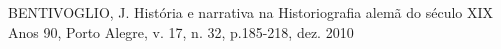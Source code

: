 \documentclass[
12pt,		%
openright,	%
twoside,  %
a4paper,			%
chapter=TITLE,		%
english,			%
french,				%
spanish,			%
brazil				%
]{USPSC-classe/USPSC_RedarTex}
\begin{document}
\begin{flushleft}
\begin{flushleft}
\begin{flushleft}
\begin{flushleft}
\begin{flushleft}
\begin{flushleft}
\begin{flushleft}
\begin{flushleft}
\begin{flushleft}
\begin{flushleft}
[BENTIVOGLIO, 2010] BENTIVOGLIO, J. Hist\'oria e narrativa na Historiografia alem\~a do s\'eculo XIX Anos 90, Porto Alegre, v. 17, n. 32, p.185-218, dez. 2010
\end{flushleft}


\end{flushleft}


\end{flushleft}


\end{flushleft}


\end{flushleft}


\end{flushleft}


\end{flushleft}


\end{flushleft}


\end{flushleft}


\end{flushleft}
\end{document}
